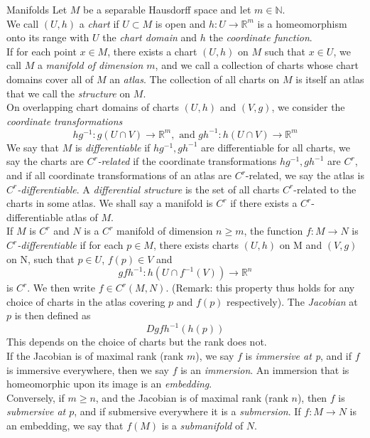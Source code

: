\documentclass[11pt, a4paper]{memoir}
\theoremstyle{break}
\theoremstyle{break}
\theoremstyle{nonumberplain}
\newcommand{\mN}{\mathbb{N}}
\newcommand{\mR}{\mathbb{R}}
\begin{document}
\begin{mydefinition}{Manifolds}
Let $M$ be a separable Hausdorff space and let $m\in \mN$.\\[5pt]
We call $(U,h)$ a \emph{chart} if $U\subset M$ is open and $h: U\to \mR^m$ is a homeomorphism onto its range with $U$ the \emph{chart domain} and $h$ the \emph{coordinate function}.\\[5pt]
If for each point $x\in M$, there exists a chart $(U,h)$ on $M$ such that $x\in U$, we call $M$ a \emph{manifold of dimension $m$}, and we call a collection of charts whose chart domains cover all of $M$ an \emph{atlas}. The collection of all charts on $M$ is itself an atlas that we call the \emph{structure} on $M$.\\[5pt]
On overlapping chart domains of charts $(U,h)$ and $(V,g)$, we consider the \emph{coordinate transformations}
$$hg^{-1}: g(U\cap V)\to \mR^m, \text{ and } gh^{-1}: h(U\cap V)\to \mR^m$$
We say that $M$ is \emph{differentiable} if $hg^{-1}, gh^{-1}$ are differentiable for all charts, we say the charts are \emph{$C^r$-related} if the coordinate transformations $hg^{-1}, gh^{-1}$ are $C^r$, and if all coordinate transformations of an atlas are $C^r$-related, we say the atlas is \emph{$C^r$-differentiable}. A \emph{differential structure} is the set of all charts $C^r$-related to the charts in some atlas. We shall say a manifold is $C^r$ if there exists a $C^r$-differentiable atlas of $M$.\\[5pt]
If $M$ is $C^r$ and $N$ is a $C^r$ manifold of dimension $n\geqslant m$, the function $f: M\to N$ is \emph{$C^r$-differentiable} if for each $p\in M$, there exists charts $(U,h)$ on M and $(V,g)$ on N, such that $p\in U$, $f(p)\in V$ and 
$$gfh^{-1}: h(U\cap f^{-1}(V))\to \mR^n$$
is $C^r$. We then write $f\in C^r(M,N)$. (Remark: this property thus holds for any choice of charts in the atlas covering $p$ and $f(p)$ respectively). The \emph{Jacobian} at $p$ is then defined as 
$$Dgfh^{-1}(h(p))$$
This depends on the choice of charts but the rank does not.\\[5pt]
If the Jacobian is of maximal rank (rank $m$), we say $f$ is \emph{immersive at p}, and if $f$ is immersive everywhere, then we say $f$ is an \emph{immersion}. An immersion that is homeomorphic upon its image is an \emph{embedding}.\\[5pt]
Conversely, if $m\geqslant n$, and the Jacobian is of maximal rank (rank $n$), then $f$ is \emph{submersive at $p$}, and if submersive everywhere it is a \emph{submersion}. If $f: M\to N$ is an embedding, we say that $f(M)$ is a \emph{submanifold} of $N$.\\[5pt]

\end{mydefinition}
\end{document}
